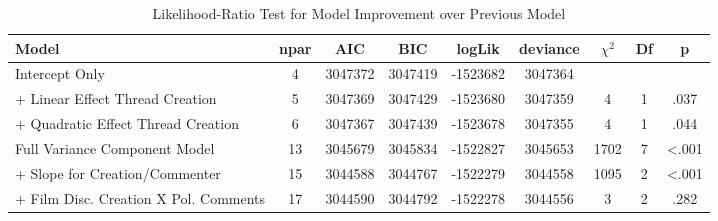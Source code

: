 \begin{table}[tb]
\begin{threeparttable}
\caption{Likelihood-Ratio Test for Model Improvement over Previous Model} 
\label{tab:Anova}
\begingroup{}
\begin{tabular}{l @{}S[table-format=2.0]@{} *{4}{@{}S[table-format=-7.0]@{}} @{}S[table-format=4.0]@{} @{ }S[table-format=2.0]@{} @{ }S[table-format=<.3]@{}}
  \toprule
Model & {npar} & {AIC} & {BIC} & {logLik} & {deviance} & {$\chi^2$} & {Df} & {p} \\ 
  \midrule
Intercept Only & 4 & 3047372 & 3047419 & -1523682 & 3047364 &  &  &  \\ 
  + Linear Effect Thread Creation & 5 & 3047369 & 3047429 & -1523680 & 3047359 & 4 & 1 & .037 \\ 
  + Quadratic Effect Thread Creation & 6 & 3047367 & 3047439 & -1523678 & 3047355 & 4 & 1 & .044 \\ 
  Full Variance Component Model & 13 & 3045679 & 3045834 & -1522827 & 3045653 & 1702 & 7 & <.001 \\ 
  + Slope for Creation/Commenter & 15 & 3044588 & 3044767 & -1522279 & 3044558 & 1095 & 2 & <.001 \\ 
  + Film Disc. Creation X Pol. Comments & 17 & 3044590 & 3044792 & -1522278 & 3044556 & 3 & 2 & .282 \\ 
   \bottomrule
\end{tabular}
\endgroup
\end{threeparttable}
\end{table}

